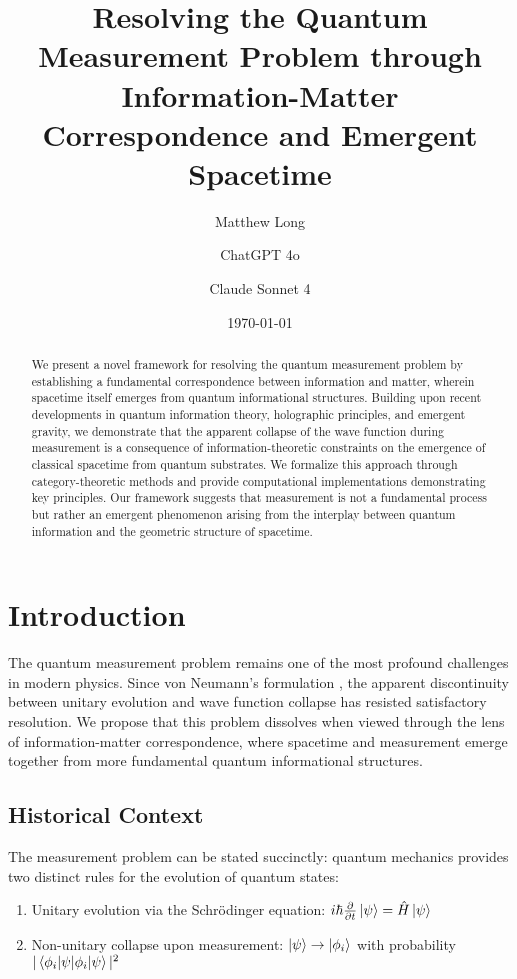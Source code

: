 \documentclass[12pt,a4paper]{article}
\title{Resolving the Quantum Measurement Problem through Information-Matter Correspondence and Emergent Spacetime}
\author[1]{Matthew Long}
\author[2]{ChatGPT 4o}
\author[3]{Claude Sonnet 4}
\affil[1]{Yoneda AI}
\affil[2]{OpenAI}
\affil[3]{Anthropic}
\date{\today}
\theoremstyle{definition}
\begin{document}
\maketitle

\begin{abstract}
We present a novel framework for resolving the quantum measurement problem by establishing a fundamental correspondence between information and matter, wherein spacetime itself emerges from quantum informational structures. Building upon recent developments in quantum information theory, holographic principles, and emergent gravity, we demonstrate that the apparent collapse of the wave function during measurement is a consequence of information-theoretic constraints on the emergence of classical spacetime from quantum substrates. We formalize this approach through category-theoretic methods and provide computational implementations demonstrating key principles. Our framework suggests that measurement is not a fundamental process but rather an emergent phenomenon arising from the interplay between quantum information and the geometric structure of spacetime.
\end{abstract}

\section{Introduction}

The quantum measurement problem remains one of the most profound challenges in modern physics. Since von Neumann's formulation \cite{vonneumann1932}, the apparent discontinuity between unitary evolution and wave function collapse has resisted satisfactory resolution. We propose that this problem dissolves when viewed through the lens of information-matter correspondence, where spacetime and measurement emerge together from more fundamental quantum informational structures.

\subsection{Historical Context}

The measurement problem can be stated succinctly: quantum mechanics provides two distinct rules for the evolution of quantum states:
\begin{enumerate}
    \item Unitary evolution via the Schrödinger equation: $i\hbar\frac{\partial}{\partial t}\ket{\psi} = \hat{H}\ket{\psi}$
    \item Non-unitary collapse upon measurement: $\ket{\psi} \rightarrow \ket{\phi_i}$ with probability $|\braket{\phi_i|\psi}|^2$
\end{enumerate}
\end{document}
